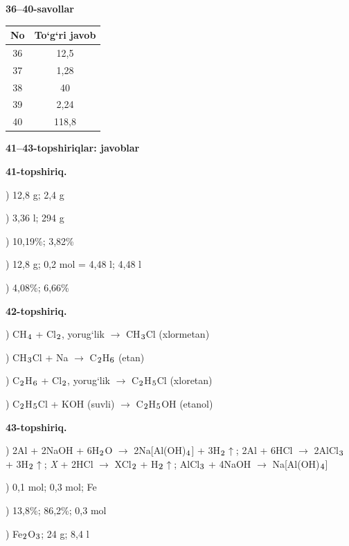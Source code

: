 \documentclass[11pt,a4paper]{article}
\renewcommand{\textsubscript}[1]{\ensuremath{_{\text{\fontsize{8}{8}\selectfont #1}}}}
\begin{document}
\noindent\textbf{36--40-savollar}\par\smallskip
\noindent\begin{tabular}{|c|c|}\hline \textbf{No} & \textbf{To`g`ri javob}\\\hline
36 & 12,5\\\hline
37 & 1,28\\\hline
38 & 40\\\hline
39 & 2,24\\\hline
40 & 118,8\\\hline
\end{tabular}\par\medskip
\noindent\textbf{41--43-topshiriqlar: javoblar}\par\smallskip
\noindent\textbf{41-topshiriq.}\par
{}) 12,8 g; 2,4 g\par
{}) 3,36 l; 294 g\par
{}) 10,19\%; 3,82\%\par
{}) 12,8 g; 0,2 mol = 4,48 l; 4,48 l\par
{}) 4,08\%; 6,66\%\par
\noindent\textbf{42-topshiriq.}\par
{}) CH\textsubscript{4} + Cl\textsubscript{2}, yorug`lik $\to$ CH\textsubscript{3}Cl (xlormetan)\par
{}) CH\textsubscript{3}Cl + Na $\to$ C\textsubscript{2}H\textsubscript{6} (etan)\par
{}) C\textsubscript{2}H\textsubscript{6} + Cl\textsubscript{2}, yorug`lik $\to$ C\textsubscript{2}H\textsubscript{5}Cl (xloretan)\par
{}) C\textsubscript{2}H\textsubscript{5}Cl + KOH (suvli) $\to$ C\textsubscript{2}H\textsubscript{5}OH (etanol)\par
\noindent\textbf{43-topshiriq.}\par
{}) 2Al + 2NaOH + 6H\textsubscript{2}O $\to$ 2Na[Al(OH)\textsubscript{4}] + 3H\textsubscript{2}$\uparrow$; 2Al + 6HCl $\to$ 2AlCl\textsubscript{3} + 3H\textsubscript{2}$\uparrow$; \textit{X} + 2HCl $\to$ XCl\textsubscript{2} + H\textsubscript{2}$\uparrow$; AlCl\textsubscript{3} + 4NaOH $\to$ Na[Al(OH)\textsubscript{4}]\par
{}) 0,1 mol; 0,3 mol; Fe\par
{}) 13,8\%; 86,2\%; 0,3 mol\par
{}) Fe\textsubscript{2}O\textsubscript{3}; 24 g; 8,4 l\par
\end{document}
